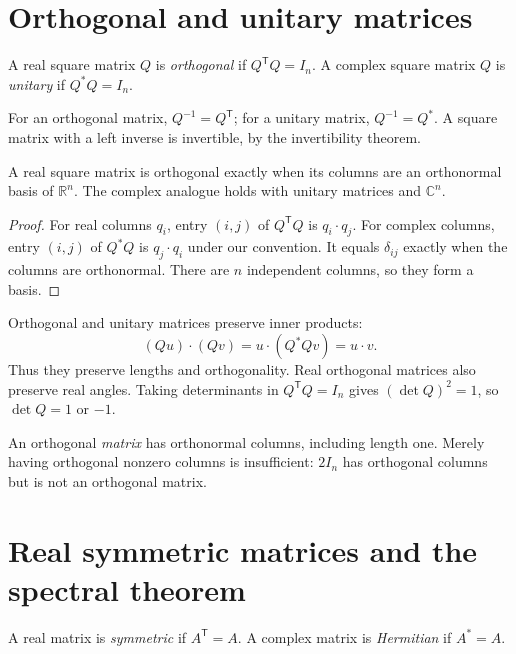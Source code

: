 \section{Orthogonal and unitary matrices}

\begin{definition}
A real square matrix $Q$ is \emph{orthogonal} if $Q^{\mathsf T}Q=I_n$.
A complex square matrix $Q$ is \emph{unitary} if $Q^*Q=I_n$.
\end{definition}

For an orthogonal matrix, $Q^{-1}=Q^{\mathsf T}$; for a unitary matrix,
$Q^{-1}=Q^*$.
A square matrix with a left inverse is invertible, by the
invertibility theorem.

\begin{proposition}
A real square matrix is orthogonal exactly when its columns are an
orthonormal basis of $\mathbb R^n$.
The complex analogue holds with unitary matrices and $\mathbb C^n$.
\end{proposition}
\begin{proof}
For real columns $q_i$, entry $(i,j)$ of $Q^{\mathsf T}Q$ is $q_i\cdot q_j$.
For complex columns, entry $(i,j)$ of $Q^*Q$ is $q_j\cdot q_i$ under
our convention. It equals $\delta_{ij}$ exactly when the columns are
orthonormal. There are $n$ independent columns, so they form a basis.
\end{proof}

Orthogonal and unitary matrices preserve inner products:
\[
 (Qu)\cdot(Qv)=u\cdot(Q^*Qv)=u\cdot v.
\]
Thus they preserve lengths and orthogonality.
Real orthogonal matrices also preserve real angles.
Taking determinants in $Q^{\mathsf T}Q=I_n$ gives
$(\det Q)^2=1$, so $\det Q=1$ or $-1$.

\begin{remark}
An orthogonal \emph{matrix} has orthonormal columns, including length one.
Merely having orthogonal nonzero columns is insufficient:
$2I_n$ has orthogonal columns but is not an orthogonal matrix.
\end{remark}

\section{Real symmetric matrices and the spectral theorem}

\begin{definition}
A real matrix is \emph{symmetric} if $A^{\mathsf T}=A$.
A complex matrix is \emph{Hermitian} if $A^*=A$.
\end{definition}

